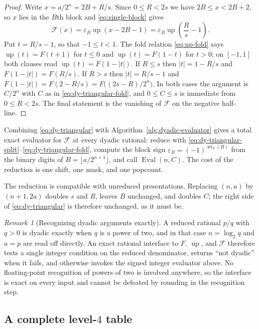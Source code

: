 \documentclass[11pt,oneside]{article}
\theoremstyle{definition}
\theoremstyle{remark}
\newtheorem{remark}[theorem]{Remark}
\newcommand{\Up}{\operatorname{up}}
\newcommand{\wt}{\operatorname{wt}_2}
\begin{document}
\begin{proof}
Write $x=a/2^n=2B+R/s$.  Since $0\le R<2s$ we have $2B\le x<2B+2$, so $x$ lies in the
$B$th block and \eqref{eq:single-block} gives
\begin{equation*}
 \mathcal F(x)=\varepsilon_B\Up(x-2B-1)=\varepsilon_B\Up\!\left(\frac Rs-1\right).
\end{equation*}
Put $t=R/s-1$, so that $-1\le t<1$.  The fold relation \eqref{eq:up-fold} says
$\Up(t)=F(t+1)$ for $t\le0$ and $\Up(t)=F(1-t)$ for $t>0$; on $[-1,1]$ both clauses read
$\Up(t)=F(1-|t|)$.  If $R\le s$ then $|t|=1-R/s$ and $F(1-|t|)=F(R/s)$.  If $R>s$ then
$|t|=R/s-1$ and $F(1-|t|)=F(2-R/s)=F\bigl((2s-R)/2^n\bigr)$.  In both cases the argument is
$C/2^n$ with $C$ as in \eqref{eq:dy-triangular-fold}, and $0\le C\le s$ is immediate from
$0\le R<2s$.  The final statement is the vanishing of $\mathcal F$ on the negative half-line.
\end{proof}

Combining \eqref{eq:dy-triangular} with Algorithm~\ref{alg:dyadic-evaluator} gives a total exact
evaluator for $\mathcal F$ at every dyadic rational: reduce with
\eqref{eq:dy-triangular-split}--\eqref{eq:dy-triangular-fold}, compute the block sign
$\varepsilon_B=(-1)^{\wt(B)}$ from the binary digits of $B=\lfloor a/2^{n+1}\rfloor$, and call
$\operatorname{Eval}(n,C)$.  The cost of the reduction is one shift, one mask, and one
popcount.

The reduction is compatible with unreduced presentations.  Replacing $(n,a)$ by $(n+1,2a)$
doubles $s$ and $R$, leaves $B$ unchanged, and doubles $C$; the right side of
\eqref{eq:dy-triangular} is therefore unchanged, as it must be.

\begin{remark}[Recognizing dyadic arguments exactly]
\label{rem:dy-rational-interface}
A reduced rational $p/q$ with $q>0$ is dyadic exactly when $q$ is a power of two, and in
that case $n=\log_2q$ and $a=p$ are read off directly.  An exact rational interface to
$F$, $\Up$, and $\mathcal F$ therefore tests a single integer condition on the reduced
denominator, returns ``not dyadic'' when it fails, and otherwise invokes the signed integer
evaluator above.  No floating-point recognition of powers of two is involved anywhere, so
the interface is exact on every input and cannot be defeated by rounding in the recognition
step.
\end{remark}

\subsection{A complete level-$4$ table}
\end{document}
